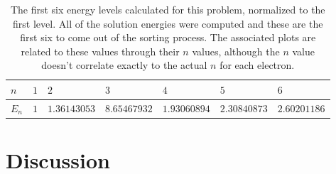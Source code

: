\documentclass[10pt, oneside, letterpaper]{article}
\begin{document}
\begin{table}
\begin{center}
\begin{tabular}{l|llllll}\hline
$n$    & $1$    & $2$     & $3$     & $4$      & $5$      & $6$      \\\hline
$E_n$  & $1$  & $1.36143053$  & $8.65467932$  & $1.93060894$  & $2.30840873$  & $2.60201186$ \\\hline

\end{tabular}
\end{center}
  \caption{The first six energy levels calculated for this problem, normalized to the first level. All of the solution energies were computed and these are the first six to come out of the sorting process. The associated plots are related to these values through their $n$ values, although the $n$ value doesn't correlate exactly to the actual $n$ for each electron.}
  \label{numerical-energies-2}
\end{table}

\section{Discussion}
\end{document}
